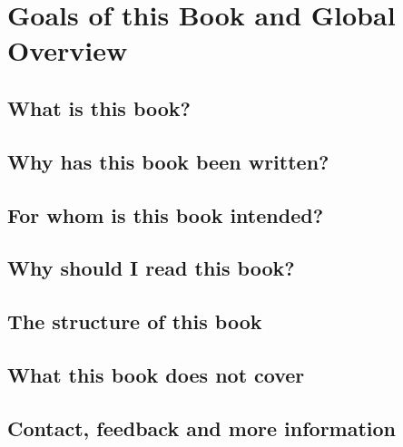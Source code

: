 \setcounter{chapter}{-1}

\chapter{Goals of this Book and Global Overview}

\section{What is this book?}

\section{Why has this book been written?}

\section{For whom is this book intended?}

\section{Why should I read this book?}

\section{The structure of this book}

\section{What this book does not cover}

\section{Contact, feedback and more information}